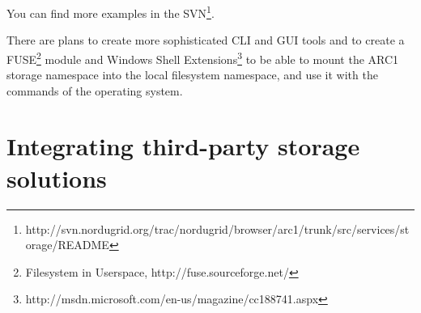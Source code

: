 \documentclass{book}
\begin{document}
You can find more examples in the SVN\footnote{http://svn.nordugrid.org/trac/nordugrid/browser/arc1/trunk/src/services/storage/README}.

There are plans to create more sophisticated CLI and GUI tools and to create a FUSE\footnote{Filesystem in Userspace, http://fuse.sourceforge.net/} module and Windows Shell Extensions\footnote{http://msdn.microsoft.com/en-us/magazine/cc188741.aspx} to be able to mount the ARC1 storage namespace into the local filesystem namespace, and use it with the commands of the operating system.



\section{Integrating third-party storage solutions} %
\label{sec:integrating_third_party_storage_solutions}
\end{document}
